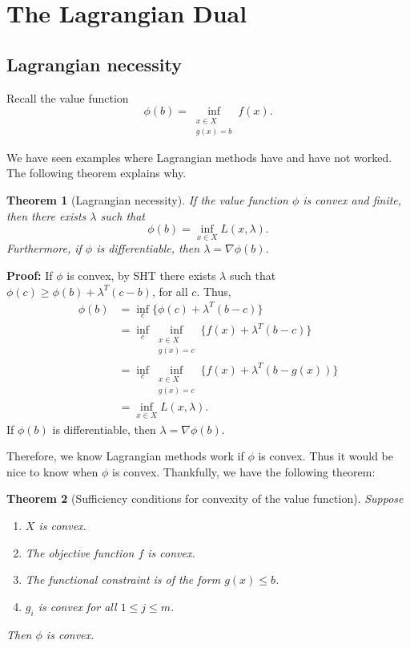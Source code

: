 \documentclass[12pt]{article}
\newtheorem{theorem}{Theorem}[section]
\theoremstyle{definition}
\theoremstyle{remark}
\begin{document}
\newpage

\section{The Lagrangian Dual}%
\label{sec:the_lagrangian_dual}

\subsection{Lagrangian necessity}%
\label{sub:lagrangian_necessity}

Recall the value function
\[
	\phi(b) = \inf_{\substack{x \in X \\ g(x) = b}} f(x)
.\]

We have seen examples where Lagrangian methods have and have not worked. The following theorem explains why.

\begin{theorem}[Lagrangian necessity]
	If the value function $\phi$ is convex and finite, then there exists $\lambda$ such that
	\[
		\phi(b)=  \inf_{x \in X} L(x, \lambda)
	.\]
	Furthermore, if $\phi$ is differentiable, then $\lambda = \nabla \phi(b)$.
\end{theorem}

\begin{adjustbox}{minipage = \columnwidth - 25.5pt, margin=1em, frame=1pt, margin=0em}
	\textbf{Proof:} If $\phi$ is convex, by SHT there exists $\lambda$ such that $\phi(c) \geq \phi(b) + \lambda^{T}(c - b)$, for all $c$. Thus,
	\begin{align*}
		\phi(b) &= \inf_{c} \{\phi(c) + \lambda^{T}(b - c) \} \\
			&= \inf_{c} \inf_{\substack{x \in X \\ g(x) = c}} \{f(x) + \lambda^{T}(b - c)\} \\
			&= \inf_{c} \inf_{\substack{x \in X \\ g(x) = c}} \{f(x) + \lambda^{T}(b - g(x))\} \\
			&= \inf_{x \in X} L(x, \lambda).
	\end{align*}
	If $\phi(b)$ is differentiable, then $\lambda = \nabla \phi(b)$.
\end{adjustbox}

Therefore, we know Lagrangian methods work if $\phi$ is convex. Thus it would be nice to know when $\phi$ is convex. Thankfully, we have the following theorem:

\begin{theorem}[Sufficiency conditions for convexity of the value function]
	Suppose
	\begin{enumerate}[\normalfont 1.]
		\item $X$ is convex.
		\item The objective function $f$ is convex.
		\item The functional constraint is of the form $g(x) \leq b$.
		\item $g_i$ is convex for all $1 \leq j \leq m$.
	\end{enumerate}
	Then $\phi$ is convex.
\end{theorem}
\end{document}
